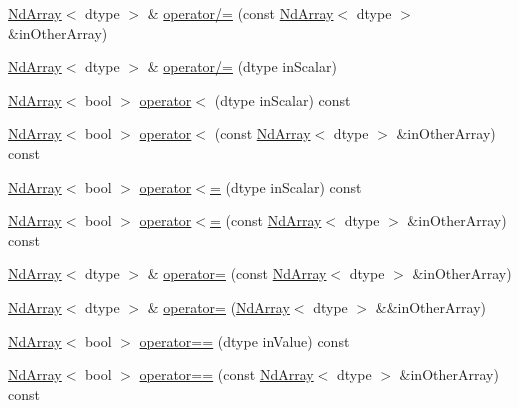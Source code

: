 \begin{DoxyCompactItemize}
\mbox{\hyperlink{class_num_c_1_1_nd_array}{Nd\+Array}}$<$ dtype $>$ \& \mbox{\hyperlink{class_num_c_1_1_nd_array_af9950420762002d301c396e1d5ab0858}{operator/=}} (const \mbox{\hyperlink{class_num_c_1_1_nd_array}{Nd\+Array}}$<$ dtype $>$ \&in\+Other\+Array)
\item 
\mbox{\hyperlink{class_num_c_1_1_nd_array}{Nd\+Array}}$<$ dtype $>$ \& \mbox{\hyperlink{class_num_c_1_1_nd_array_a367f7ca671c2c35bda980bb7fff8adf2}{operator/=}} (dtype in\+Scalar)
\item 
\mbox{\hyperlink{class_num_c_1_1_nd_array}{Nd\+Array}}$<$ bool $>$ \mbox{\hyperlink{class_num_c_1_1_nd_array_ae6e2f419585540a0198dd500f2c6a547}{operator$<$}} (dtype in\+Scalar) const
\item 
\mbox{\hyperlink{class_num_c_1_1_nd_array}{Nd\+Array}}$<$ bool $>$ \mbox{\hyperlink{class_num_c_1_1_nd_array_a206b5abfcdd532efadeec123979dcb08}{operator$<$}} (const \mbox{\hyperlink{class_num_c_1_1_nd_array}{Nd\+Array}}$<$ dtype $>$ \&in\+Other\+Array) const
\item 
\mbox{\hyperlink{class_num_c_1_1_nd_array}{Nd\+Array}}$<$ bool $>$ \mbox{\hyperlink{class_num_c_1_1_nd_array_a6ca5d2e5f0365adf35747b26fd4a892f}{operator$<$=}} (dtype in\+Scalar) const
\item 
\mbox{\hyperlink{class_num_c_1_1_nd_array}{Nd\+Array}}$<$ bool $>$ \mbox{\hyperlink{class_num_c_1_1_nd_array_ab99797f22be77924d4c54a6c54829fa1}{operator$<$=}} (const \mbox{\hyperlink{class_num_c_1_1_nd_array}{Nd\+Array}}$<$ dtype $>$ \&in\+Other\+Array) const
\item 
\mbox{\hyperlink{class_num_c_1_1_nd_array}{Nd\+Array}}$<$ dtype $>$ \& \mbox{\hyperlink{class_num_c_1_1_nd_array_a77394f32f4c803587139f379ebd738d0}{operator=}} (const \mbox{\hyperlink{class_num_c_1_1_nd_array}{Nd\+Array}}$<$ dtype $>$ \&in\+Other\+Array)
\item 
\mbox{\hyperlink{class_num_c_1_1_nd_array}{Nd\+Array}}$<$ dtype $>$ \& \mbox{\hyperlink{class_num_c_1_1_nd_array_a7c463b2a87b68f63eeb83c88c55ffbe4}{operator=}} (\mbox{\hyperlink{class_num_c_1_1_nd_array}{Nd\+Array}}$<$ dtype $>$ \&\&in\+Other\+Array)
\item 
\mbox{\hyperlink{class_num_c_1_1_nd_array}{Nd\+Array}}$<$ bool $>$ \mbox{\hyperlink{class_num_c_1_1_nd_array_aba7821dd819fd42024c36706816dd4a6}{operator==}} (dtype in\+Value) const
\item 
\mbox{\hyperlink{class_num_c_1_1_nd_array}{Nd\+Array}}$<$ bool $>$ \mbox{\hyperlink{class_num_c_1_1_nd_array_a3abe0b9a995e04444d124a4d3b4b332e}{operator==}} (const \mbox{\hyperlink{class_num_c_1_1_nd_array}{Nd\+Array}}$<$ dtype $>$ \&in\+Other\+Array) const

\end{DoxyCompactItemize}
